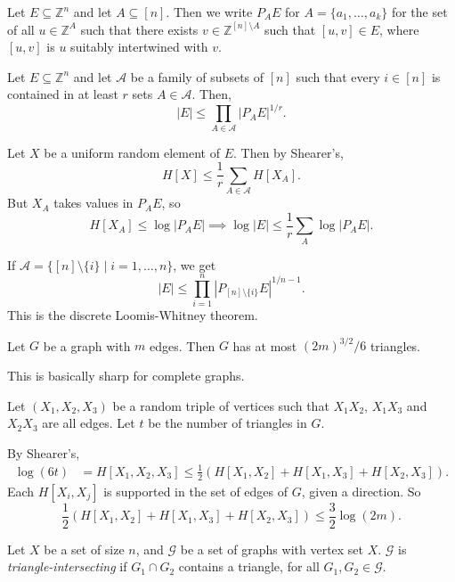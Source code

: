 \documentclass[12pt]{article}
\begin{document}
Let $E \subseteq \mathbb{Z}^{n}$ and let $A \subseteq [n]$. Then we write $P_A E$ for $A = \{a_1, \ldots, a_k\}$ for the set of all $u \in \mathbb{Z}^{A}$ such that there exists $v \in \mathbb{Z}^{[n] \setminus A}$ such that $[u, v] \in E$, where $[u, v]$ is $u$ suitably intertwined with $v$.

\begin{corollary}
	Let $E \subseteq \mathbb{Z}^{n}$ and let $\mathcal{A}$ be a family of subsets of $[n]$ such that every $i \in [n]$ is contained in at least $r$ sets $A \in \mathcal{A}$. Then,
	\[
	|E| \leq \prod_{A \in \mathcal{A}}|P_A E|^{1/r}.
	\]
\end{corollary}
\begin{proofbox}
	Let $X$ be a uniform random element of $E$. Then by Shearer's,
	\[
		H[X] \leq \frac 1r \sum_{A \in \mathcal{A}} H[X_A].
	\]
	But $X_A$ takes values in $P_A E$, so
	\[
	H[X_A] \leq \log |P_AE| \implies \log |E| \leq \frac 1r \sum_A \log |P_A E|.
	\]
\end{proofbox}

If $\mathcal{A} = \{ [n] \setminus \{i\} \mid i = 1, \ldots, n\}$, we get
\[
	|E| \leq \prod_{i=1}^{n} | P_{[n] \setminus \{i\}} E |^{1/n-1}.
\]
This is the discrete Loomis-Whitney theorem.
\begin{theorem}
	Let $G$ be a graph with $m$ edges. Then $G$ has at most $(2m)^{3/2}/6$ triangles.
\end{theorem}
This is basically sharp for complete graphs.
\begin{proofbox}
	Let $(X_1, X_2, X_3)$ be a random triple of vertices such that $X_1 X_2$, $X_1 X_3$ and $X_2 X_3$ are all edges. Let $t$ be the number of triangles in $G$.

	By Shearer's,
	\begin{align*}
		\log(6t) &= H[X_1, X_2, X_3] \leq \frac12 (H[X_1,X_2] + H[X_1,X_3] + H[X_2,X_3]).
	\end{align*}
	Each $H[X_i, X_j]$ is supported in the set of edges of $G$, given a direction. So
	\[
		\frac 12 (H[X_1, X_2] + H[X_1, X_3] + H[X_2, X_3]) \leq \frac 32 \log (2m).
	\]
\end{proofbox}

\begin{definition}
	Let $X$ be a set of size $n$, and $\mathcal{G}$ be a set of graphs with vertex set $X$. $\mathcal{G}$ is \emph{triangle-intersecting} if $G_1 \cap G_2$ contains a triangle, for all $G_1, G_2 \in \mathcal{G}$.
\end{definition}
\end{document}
